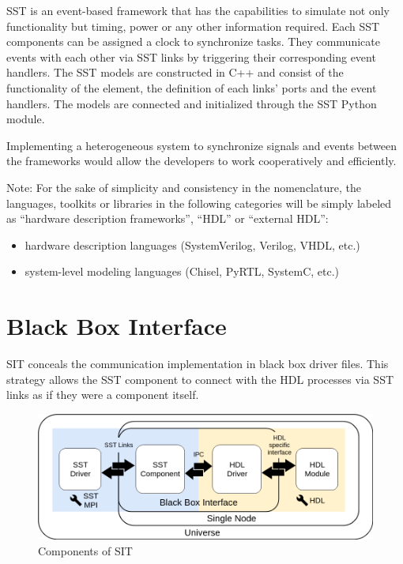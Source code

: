 \documentclass{article}
\begin{document}
  SST is an event-based framework that has the capabilities to simulate not only functionality but
  timing, power or any other information required. Each SST components can be assigned a clock to
  synchronize tasks. They communicate events with each other via SST links by triggering their
  corresponding event handlers. The SST models are constructed in C++ and consist of the
  functionality of the element, the definition of each links' ports and the event handlers. The
  models are connected and initialized through the SST Python module.


  Implementing a heterogeneous system to synchronize signals and events between the frameworks would
  allow the developers to work cooperatively and efficiently.


  Note: For the sake of simplicity and consistency in the nomenclature, the languages, toolkits or
  libraries in the following categories will be simply labeled as ``hardware description
  frameworks'', ``HDL'' or ``external HDL'':
  \begin{itemize}
    \item hardware description languages (SystemVerilog, Verilog, VHDL, etc.)
    \item system-level modeling languages (Chisel, PyRTL, SystemC, etc.)
  \end{itemize}

  \section{Black Box Interface}
  SIT conceals the communication implementation in black box driver files. This strategy allows the
  SST component to connect with the HDL processes via SST links as if they were a component itself.

  \begin{figure}[!h]
    \centering
    \includegraphics[width=6.5in]{diagrams/comm.png}
    \caption{Components of SIT}
    \label{fig:comm}
  \end{figure}
\end{document}
